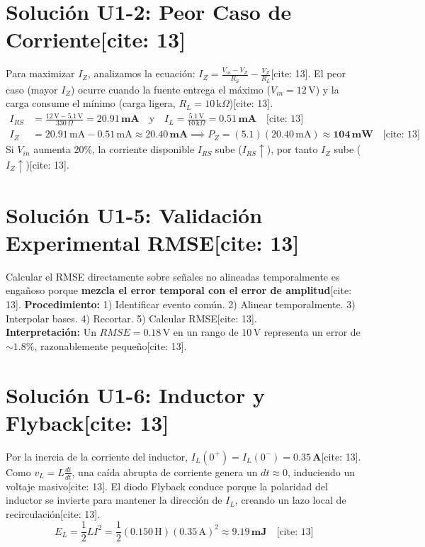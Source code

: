 \documentclass[11pt, a4paper]{article}
\begin{document}
\section*{Solución U1-2: Peor Caso de Corriente[cite: 13]}
Para maximizar $I_Z$, analizamos la ecuación: $\displaystyle I_Z = \frac{V_{in} - V_Z}{R_S} - \frac{V_Z}{R_L}$[cite: 13].
El peor caso (mayor $I_Z$) ocurre cuando la fuente entrega el máximo ($V_{in} = 12\,\text{V}$) y la carga consume el mínimo (carga ligera, $R_L = 10\,\text{k}\Omega$)[cite: 13].
\begin{align*}
    I_{RS} &= \frac{12\,\text{V} - 5.1\,\text{V}}{330\,\Omega} = \mathbf{20.91\,\text{mA}} \quad \text{y} \quad I_L = \frac{5.1\,\text{V}}{10\,\text{k}\Omega} = \mathbf{0.51\,\text{mA}} \quad \text{[cite: 13]} \\
    I_Z &= 20.91\,\text{mA} - 0.51\,\text{mA} \approx \mathbf{20.40\,\text{mA}} \implies P_Z = (5.1)(20.40\,\text{mA}) \approx \mathbf{104\,\text{mW}} \quad \text{[cite: 13]}
\end{align*}
Si $V_{in}$ aumenta 20\%, la corriente disponible $I_{RS}$ sube ($I_{RS}\uparrow$), por tanto $I_Z$ sube ($I_Z\uparrow$)[cite: 13].

\section*{Solución U1-5: Validación Experimental RMSE[cite: 13]}
Calcular el RMSE directamente sobre señales no alineadas temporalmente es engañoso porque \textbf{mezcla el error temporal con el error de amplitud}[cite: 13].
\textbf{Procedimiento:} 1) Identificar evento común. 2) Alinear temporalmente. 3) Interpolar bases. 4) Recortar. 5) Calcular RMSE[cite: 13]. \\
\textbf{Interpretación:} Un $RMSE = 0.18\,\text{V}$ en un rango de $10\,\text{V}$ representa un error de $\sim 1.8\%$, razonablemente pequeño[cite: 13].

\section*{Solución U1-6: Inductor y Flyback[cite: 13]}
Por la inercia de la corriente del inductor, $I_L(0^+) = I_L(0^-) = \mathbf{0.35\,\text{A}}$[cite: 13]. 
Como $v_L = L \frac{di}{dt}$, una caída abrupta de corriente genera un $dt \approx 0$, induciendo un voltaje masivo[cite: 13].
El diodo Flyback conduce porque la polaridad del inductor se invierte para mantener la dirección de $I_L$, creando un lazo local de recirculación[cite: 13].
$$ E_L = \frac{1}{2} L I^2 = \frac{1}{2} (0.150\,\text{H}) (0.35\,\text{A})^2 \approx \mathbf{9.19\,\text{mJ}} \quad \text{[cite: 13]} $$
\end{document}
